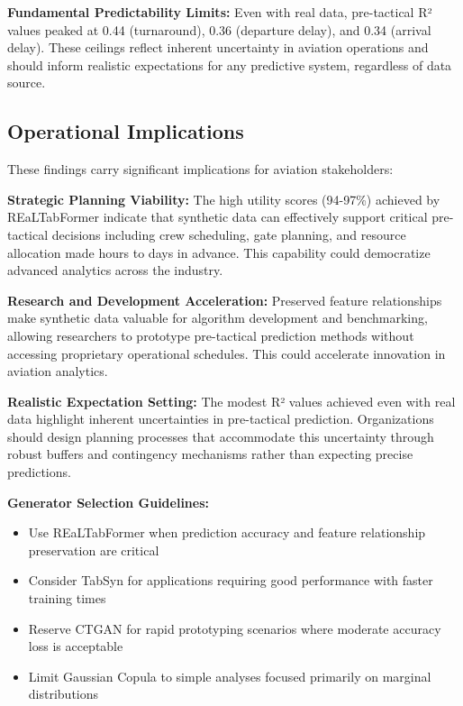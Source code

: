 \documentclass[conference]{IEEEtran}
\begin{document}
\textbf{Fundamental Predictability Limits:} Even with real data, pre-tactical R² values peaked at 0.44 (turnaround), 0.36 (departure delay), and 0.34 (arrival delay). These ceilings reflect inherent uncertainty in aviation operations and should inform realistic expectations for any predictive system, regardless of data source.

\subsection{Operational Implications}

These findings carry significant implications for aviation stakeholders:

\textbf{Strategic Planning Viability:} The high utility scores (94-97\%) achieved by REaLTabFormer indicate that synthetic data can effectively support critical pre-tactical decisions including crew scheduling, gate planning, and resource allocation made hours to days in advance. This capability could democratize advanced analytics across the industry.

\textbf{Research and Development Acceleration:} Preserved feature relationships make synthetic data valuable for algorithm development and benchmarking, allowing researchers to prototype pre-tactical prediction methods without accessing proprietary operational schedules. This could accelerate innovation in aviation analytics.

\textbf{Realistic Expectation Setting:} The modest R² values achieved even with real data highlight inherent uncertainties in pre-tactical prediction. Organizations should design planning processes that accommodate this uncertainty through robust buffers and contingency mechanisms rather than expecting precise predictions.

\textbf{Generator Selection Guidelines:} 
\begin{itemize}
    \item Use REaLTabFormer when prediction accuracy and feature relationship preservation are critical
    \item Consider TabSyn for applications requiring good performance with faster training times
    \item Reserve CTGAN for rapid prototyping scenarios where moderate accuracy loss is acceptable
    \item Limit Gaussian Copula to simple analyses focused primarily on marginal distributions
\end{itemize}
\end{document}
